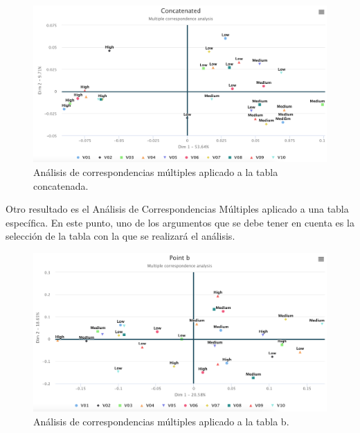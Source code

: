 \documentclass[mathematics,article,submit,moreauthors,pdftex]{mdpi}
\begin{document}
\begin{figure}[H]


\begin{center}\includegraphics[width=0.9\linewidth,]{concatenated} \end{center}

\caption{Análisis de correspondencias múltiples aplicado a la tabla concatenada.}

\label{fig:concatenatedfig}
\end{figure}

Otro resultado es el Análisis de Correspondencias Múltiples aplicado a
una tabla específica. En este punto, uno de los argumentos que se debe
tener en cuenta es la selección de la tabla con la que se realizará el
análisis.

\begin{figure}[H]


\begin{center}\includegraphics[width=0.9\linewidth,]{pointb} \end{center}

\caption{Análisis de correspondencias múltiples aplicado a la tabla b.}

\label{fig:bfig}
\end{figure}
\end{document}
